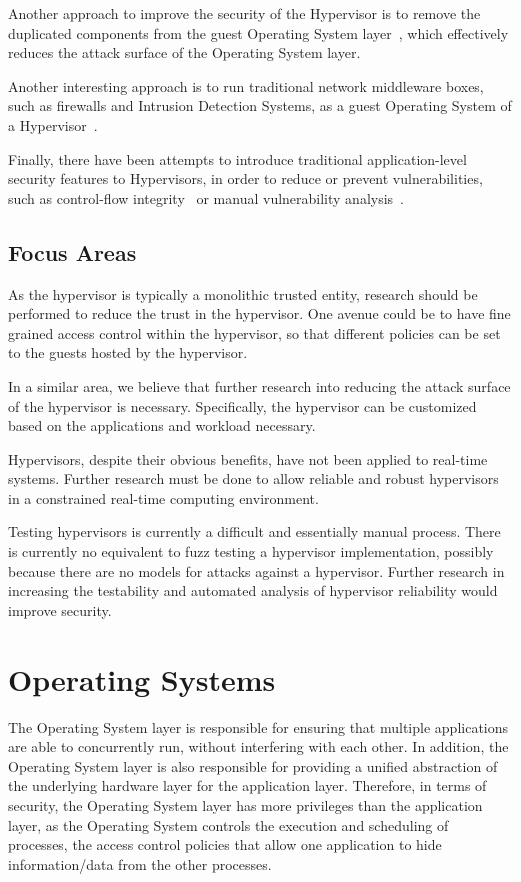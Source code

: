 \documentclass[11pt,letterpaper]{article}
\begin{document}
Another approach to improve the security of the Hypervisor is to
remove the duplicated components from the guest Operating System
layer~\cite{kivity2014, madhavapeddy2015}, which effectively reduces
the attack surface of the Operating System layer.

Another interesting approach is to run traditional network middleware
boxes, such as firewalls and Intrusion Detection Systems, as a guest
Operating System of a Hypervisor~\cite{martins2014}.

Finally, there have been attempts to introduce traditional
application-level security features to Hypervisors, in order to reduce
or prevent vulnerabilities, such as control-flow
integrity~\cite{wang2010} or manual vulnerability
analysis~\cite{Perez-Botero2013}.

\subsection{Focus Areas}

As the hypervisor is typically a monolithic trusted entity, research
should be performed to reduce the trust in the hypervisor. One avenue
could be to have fine grained access control within the hypervisor, so
that different policies can be set to the guests hosted by the
hypervisor.

In a similar area, we believe that further research into reducing the
attack surface of the hypervisor is necessary. Specifically, the
hypervisor can be customized based on the applications and workload
necessary. 

Hypervisors, despite their obvious benefits, have not been applied to
real-time systems. Further research must be done to allow reliable and
robust hypervisors in a constrained real-time computing environment.

Testing hypervisors is currently a difficult and essentially manual
process. There is currently no equivalent to fuzz testing a hypervisor
implementation, possibly because there are no models for attacks
against a hypervisor. Further research in increasing the testability
and automated analysis of hypervisor reliability would improve security.

\section{Operating Systems}

The Operating System layer is responsible for ensuring that multiple
applications are able to concurrently run, without interfering with
each other. In addition, the Operating System layer is also
responsible for providing a unified abstraction of the underlying
hardware layer for the application layer. Therefore, in terms of
security, the Operating System layer has more privileges than the
application layer, as the Operating System controls the execution and
scheduling of processes, the access control policies that allow one
application to hide information/data from the other processes.
\end{document}
